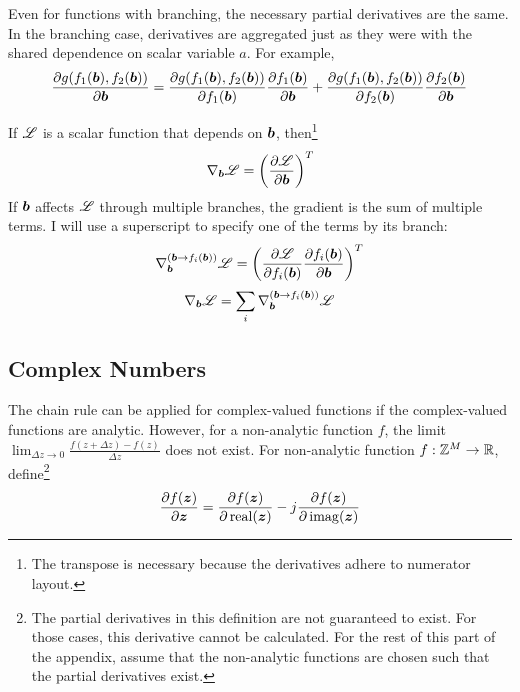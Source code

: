\begin{appendices}
Even for functions with branching, the necessary partial derivatives are the same. In the branching case, derivatives are aggregated just as they were with the shared dependence on scalar variable $a$. For example,
\begin{equation}
\frac{\partial g(f_1(\bm{b}),f_2(\bm{b}))}{\partial \bm{b}} = \frac{\partial g(f_1(\bm{b}),f_2(\bm{b}))}{\partial f_1(\bm{b})}\frac{\partial f_1(\bm{b})}{\partial \bm{b}} + \frac{\partial g(f_1(\bm{b}),f_2(\bm{b}))}{\partial f_2(\bm{b})}\frac{\partial f_2(\bm{b})}{\partial \bm{b}} 
\end{equation}

If $\mathscr{L}$ is a scalar function that depends on $\bm{b}$, then\footnote{The transpose is necessary because the derivatives adhere to numerator layout.}
\begin{equation}
\nabla_{\bm{b}} \mathscr{L} = \left(\frac{\partial \mathscr{L}}{\partial \bm{b}}\right)^T
\end{equation}
If $\bm{b}$ affects $\mathscr{L}$ through multiple branches, the gradient is the sum of multiple terms. I will use a superscript to specify one of the terms by its branch:
\begin{equation}
\nabla^{(\bm{b} \rightarrow f_i(\bm{b}))}_{\bm{b}} \mathscr{L} = \left(\frac{\partial \mathscr{L}}{\partial f_i(\bm{b})}\frac{\partial f_i(\bm{b})}{\partial \bm{b}}\right)^T
\end{equation}
\begin{equation}
\nabla_{\bm{b}} \mathscr{L} = \sum_i \nabla^{(\bm{b} \rightarrow f_i(\bm{b}))}_{\bm{b}} \mathscr{L}
\end{equation}

\subsection{Complex Numbers}
The chain rule can be applied for complex-valued functions if the complex-valued functions are analytic. However, for a non-analytic function $f$, the limit $\lim_{\Delta z \rightarrow 0} \frac{f(z + \Delta z) - f(z)}{\Delta z}$ does not exist. For non-analytic function $f: \mathbb{Z}^M \rightarrow \mathbb{R}$, define\footnote{The partial derivatives in this definition are not guaranteed to exist. For those cases, this derivative cannot be calculated. For the rest of this part of the appendix, assume that the non-analytic functions are chosen such that the partial derivatives exist.}
\begin{equation} \label{equation:Derivative Definition}
\frac{\partial f(\bm{z})}{ \partial \bm{z}} = \frac{\partial f(\bm{z})}{\partial \operatorname{real}(\bm{z})} - j\frac{\partial f(\bm{z})}{\partial \operatorname{imag}(\bm{z})}
\end{equation}


\end{appendices}
